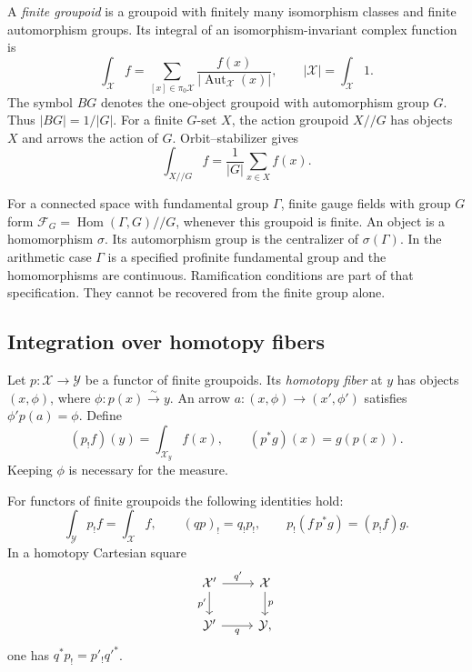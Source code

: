 A \emph{finite groupoid} is a groupoid with finitely many isomorphism
classes and finite automorphism groups. Its integral of an
isomorphism-invariant complex function is
\begin{equation}
 \int_{\mathcal X} f
 =\sum_{[x]\in\pi_0\mathcal X}
       \frac{f(x)}{|\operatorname{Aut}_{\mathcal X}(x)|},
 \qquad
 |\mathcal X|=\int_{\mathcal X}1.
 \label{v4-arith:cs:eq:integral}
\end{equation}
The symbol \(BG\) denotes the one-object groupoid with automorphism group
\(G\). Thus \(|BG|=1/|G|\). For a finite \(G\)-set \(X\), the action
groupoid \(X//G\) has objects \(X\) and arrows the action of \(G\).
Orbit--stabilizer gives
\begin{equation}
 \int_{X//G}f=\frac1{|G|}\sum_{x\in X}f(x).
 \label{v4-arith:cs:eq:action-integral}
\end{equation}

For a connected space with fundamental group \(\Gamma\), finite gauge fields
with group \(G\) form \(\mathcal F_G=\operatorname{Hom}(\Gamma,G)//G\),
whenever this groupoid is finite. An object is a homomorphism \(\sigma\).
Its automorphism group is the centralizer of \(\sigma(\Gamma)\). In the
arithmetic case \(\Gamma\) is a specified profinite fundamental group and
the homomorphisms are continuous. Ramification conditions are part of that
specification. They cannot be recovered from the finite group alone.

\subsection{Integration over homotopy fibers}

Let \(p:\mathcal X\to\mathcal Y\) be a functor of finite groupoids. Its
\emph{homotopy fiber} at \(y\) has objects \((x,\phi)\), where
\(\phi:p(x)\xrightarrow{\sim}y\). An arrow \(a:(x,\phi)\to(x',\phi')\)
satisfies \(\phi' p(a)=\phi\). Define
\[
 (p_!f)(y)=\int_{\mathcal X_y}f(x),\qquad
 (p^*g)(x)=g(p(x)).
\]
Keeping \(\phi\) is necessary for the measure.

\begin{theorem}
\label{v4-arith:cs:thm:fubini}
For functors of finite groupoids the following identities hold:
\[
 \int_{\mathcal Y}p_!f=\int_{\mathcal X}f,
 \qquad (q p)_!=q_!p_!,
 \qquad p_!(f\,p^*g)=(p_!f)g.
\]
In a homotopy Cartesian square
\[
\begin{tikzcd}
 \mathcal X' \ar[r,"q'"]\ar[d,"p'"']&
 \mathcal X\ar[d,"p"]\\
 \mathcal Y'\ar[r,"q"']&\mathcal Y,
\end{tikzcd}
\] one has \(q^*p_!=p'_!q'^*\).
\end{theorem}

